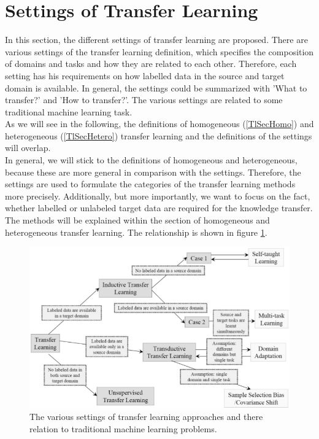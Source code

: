 \section{Settings of Transfer Learning}\label{DefTlSecSett} %
In this section, the different settings of transfer learning are proposed.
There are various settings of the transfer learning definition, which specifies the composition of domains and tasks and how they are related to each other.
Therefore, each setting has his requirements on how labelled data in the source and target domain is available.
In general, the settings could be summarized with 'What to transfer?' and 'How to transfer?'.
The various settings are related to some traditional machine learning task.\cite{Pan.2010}\\
As we will see in the following, the definitions of homogeneous (\ref{TlSecHomo}) and heterogeneous (\ref{TlSecHetero}) transfer learning and the definitions of the settings will overlap.\cite[p. 5-6]{Weiss.2016}\\
In general, we will stick to the definitions of homogeneous and heterogeneous, because these are more general in comparison with the settings.
Therefore, the settings are used to formulate the categories of the transfer learning methods more precisely.
Additionally, but more importantly, we want to focus on the fact, whether labelled or unlabeled target data are required for the knowledge transfer.
The methods will be explained within the section of homogeneous and heterogeneous transfer learning.
The relationship is shown in figure \ref{FigSettingsTransferLearning}.
\begin{figure}
	\centering
	\includegraphics[width=.8\linewidth]{figures/SettingsTransferLearning.png}
	\caption[Settings of Transfer Learning]{The various settings of transfer learning approaches and there relation to traditional machine learning problems.\cite{Pan.2010}}
	\label{FigSettingsTransferLearning}
\end{figure}

